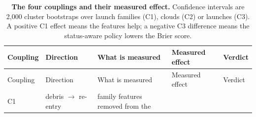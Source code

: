 \documentclass[3p,times]{elsarticle}
\begin{document}
\begin{longtable}[]{@{}
  >{\raggedright\arraybackslash}p{}
  >{\raggedright\arraybackslash}p{}
  >{\raggedright\arraybackslash}p{}
  >{\raggedright\arraybackslash}p{}
  >{\raggedright\arraybackslash}p{}@{}}
\caption{\textbf{The four couplings and their measured effect.}
Confidence intervals are 2,000 cluster bootstraps over launch families
(C1), clouds (C2) or launches (C3). A positive C1 effect means the
features help; a negative C3 difference means the status-aware policy
lowers the Brier score.}\label{tbl:couplings}\tabularnewline
\toprule\noalign{}
\begin{minipage}[b]{\linewidth}\raggedright
Coupling
\end{minipage} & \begin{minipage}[b]{\linewidth}\raggedright
Direction
\end{minipage} & \begin{minipage}[b]{\linewidth}\raggedright
What is measured
\end{minipage} & \begin{minipage}[b]{\linewidth}\raggedright
Measured effect
\end{minipage} & \begin{minipage}[b]{\linewidth}\raggedright
Verdict
\end{minipage} \\
\midrule\noalign{}
\endfirsthead
\toprule\noalign{}
\begin{minipage}[b]{\linewidth}\raggedright
Coupling
\end{minipage} & \begin{minipage}[b]{\linewidth}\raggedright
Direction
\end{minipage} & \begin{minipage}[b]{\linewidth}\raggedright
What is measured
\end{minipage} & \begin{minipage}[b]{\linewidth}\raggedright
Measured effect
\end{minipage} & \begin{minipage}[b]{\linewidth}\raggedright
Verdict
\end{minipage} \\
\midrule\noalign{}
\endhead
\bottomrule\noalign{}
\endlastfoot
C1 & debris \(\rightarrow\) re-entry & family features removed from the

\end{longtable}
\end{document}
